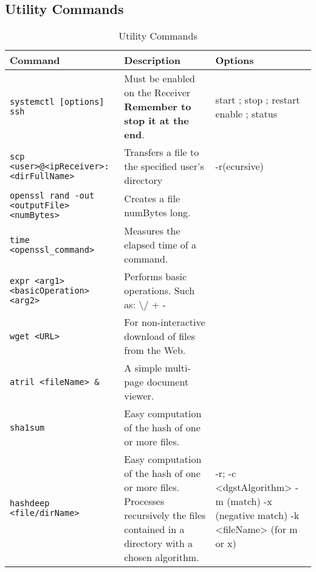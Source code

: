 \subsection{Utility Commands}
\begin{table}[H]
	\centering
    \begin{tabular}{|p{5cm}|p{6cm}|p{5cm}|}\hline
        \rowcolor{gray!30}
        \textbf{Command} & \textbf{Description} & \textbf{Options} \\ \hline

		\texttt{systemctl [options] ssh} 
		& Must be enabled on the Receiver
			\newline \textbf{Remember to stop it at the end}.
		& start ; stop ; restart
			\newline enable ; status 
		\\ \hline

		\texttt{scp <user>@<ipReceiver>\newline:<dirFullName>} 
		& Transfers a file to the specified user’s directory
		& -r(ecursive)
		\\ \hline

		\texttt{openssl rand -out <outputFile> <numBytes>} 
		& Creates a file numBytes long.
		&
		\\ \hline

		\texttt{time <openssl\_command>}
			& Measures the elapsed time of a command.
			&
			\\ \hline

		\texttt{expr <arg1> <basicOperation> <arg2>}
			& Performs basic operations.
				\newline Such as: \textbackslash* / + - 
			& 
			\\ \hline
		
		\texttt{wget <URL>}
			& For non-interactive download of files from the Web.
			& 
			\\ \hline

		\texttt{atril <fileName> \&}
			& A simple multi-page document viewer.
			& 
			\\ \hline

		\texttt{sha1sum}
			& Easy computation of the hash of one or more files.
			& 
			\\ \hline

		\texttt{hashdeep <file/dirName>}
			& Easy computation of the hash of one or more files. Processes recursively the files contained in a directory with a chosen algorithm.
			& -r; -c <dgstAlgorithm>
				\newline -m (match)
				\newline -x (negative match)
				\newline -k <fileName> (for m or x)
			\\ \hline

	\end{tabular}
	\label{tab:utilityCommands}
	\caption{Utility Commands}
\end{table}

